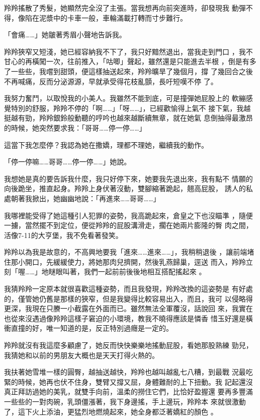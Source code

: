 羚羚搖散了秀髮，她顯然完全沒了主張。當我想再向前突進時，卻發現我
動彈不得，像陷在泥漿中的卡車一般，車輪滿載打轉而寸步難行。

「會痛……」她皺著秀眉小聲地告訴我。

羚羚狹窄又短淺，她已經容納我不下了，我只好黯然退出，當我走到門口
，我不甘心的再橫闖一次，往前推入，「咕唧」聲起，雖然還是只能進去半根
，倒是有多了一些些，我嚐到甜頭，便這樣抽送起來，羚羚曠旱了幾個月，撐
了幾回合之後不再喊痛，反而分泌源源，早就承受得花枝亂顫，長吁短嘆不停
了。

我努力奮鬥，以取悅我的小美人。我雖然不能到底，可是撞彈她屁股上的
軟繃感覺特別的舒服，羚羚不停的「啊……」「呀……」，已經歡愉得上氣不
接下氣，我越挺越有勁，羚羚銀鈴般動聽的哼吟也越來越斷續無章，就在她氣
息倒抽得最激昂的時候，她突然要求我：「哥哥……停一停……」

這當下我怎麼停？我認為她在撒嬌，理都不理她，繼續我的動作。

「停一停嘛……哥哥……停一停……」她說。

我想她是真的要告訴我什麼，我只好停下來，她要我先退出來，我有點不
情願的向後跪坐，推直起身。羚羚上身伏著沒動，雙腳縮著跪起，翹高屁股，
誘人的私處朝著我掀出，她幽幽地說：「再進來……哥哥……」

我哪裡能受得了她這種引人犯罪的姿勢，我高跪起來，倉皇之下也沒瞄準
，隨便一擄，當然擺不到定位，便從羚羚的屁股溝滑走，擱在她兩片膨隆的臀
肉之間，活像7-11的大亨堡，我不免看著發笑。

羚羚以為我是故意的，不高興地要我「進來……進來……」，我稍稍退後
，讓前端堵住那小開口，先緩緩使力，將她那肉兒擠開，然後乳燕歸巢，逕送
而入，羚羚立刻「喔……」地瞇眼叫著，我們一起前前後後地相互搭配搖起來
。

我猜羚羚一定原本就很喜歡這種姿勢，而且我發現，羚羚改換的這姿勢是
有好處的，僅管她仍舊是那樣的狹窄，但是我變得比較容易出入，而且，我可
以侵略得更深，我現在只賸一小截露在外面而已。雖然無法全軍覆沒，話說回
來，我實在也從來沒遇過像羚羚這樣子窘迫的小環境，教我不曉得應該是憐香
惜玉好還是橫衝直撞的好，唯一知道的是，反正特別過癮是一定的。

羚羚就沒有我這麼多顧慮了，她反而快快樂樂地搖動屁股，看她那股熟練
勁兒，我猜她和以前的男朋友大概也是天天打得火熱的。

我扶著她雪堆一樣的圓臀，越抽送越快，羚羚也越叫越亂七八糟，到最戰
況最吃緊的時候，她再也伏不住身，雙臂又撐又屈，身體難耐的上下扭動。我
記起還沒真正拜訪過她的美乳，就雙手向前，溫柔的撈住它們，比恰好盈握還
要再多豐滿一些些的一對肉碗，乳頭僵漲著，我下身邊搖，手上邊玩，羚羚本
來就很激動了，這下火上添油，更猛烈地燃燒起來，她全身都泛著嬌紅的顏色
。

